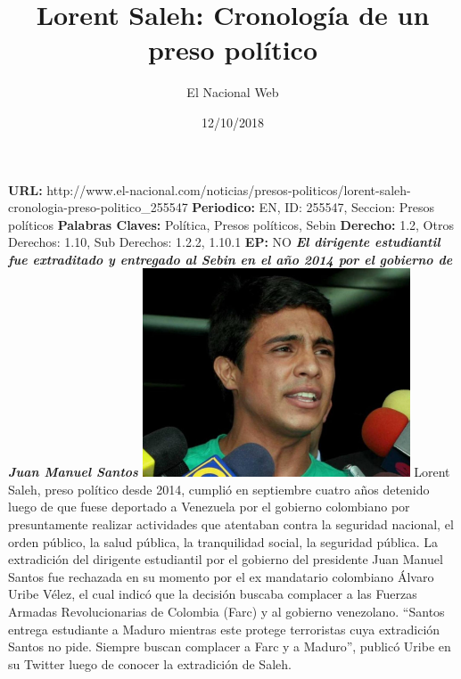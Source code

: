 \documentclass{article}%
\title{\textbf{Lorent Saleh: Cronología de un preso político}}%
\author{El Nacional Web}%
\date{12/10/2018}%
\begin{document}
%
\normalsize%
\maketitle%
\textbf{URL: }%
http://www.el{-}nacional.com/noticias/presos{-}politicos/lorent{-}saleh{-}cronologia{-}preso{-}politico\_255547\newline%
%
\textbf{Periodico: }%
EN, %
ID: %
255547, %
Seccion: %
Presos políticos\newline%
%
\textbf{Palabras Claves: }%
Política, Presos políticos, Sebin\newline%
%
\textbf{Derecho: }%
1.2, %
Otros Derechos: %
1.10, %
Sub Derechos: %
1.2.2, 1.10.1\newline%
%
\textbf{EP: }%
NO\newline%
\newline%
%
\textbf{\textit{El dirigente estudiantil fue extraditado y entregado al Sebin en el año 2014 por el gobierno de Juan Manuel Santos}}%
\newline%
\newline%
%
\includegraphics[width=300px]{111.jpg}%
\newline%
%
Lorent Saleh, preso político desde 2014, cumplió en septiembre cuatro años detenido luego de que fuese deportado a Venezuela por el gobierno colombiano por presuntamente realizar actividades que atentaban contra la seguridad nacional, el orden público, la salud pública, la tranquilidad social, la seguridad pública.%
\newline%
%
La extradición del dirigente estudiantil por el gobierno del presidente Juan Manuel Santos fue rechazada en su momento por el ex mandatario colombiano Álvaro Uribe Vélez, el cual indicó que la decisión buscaba complacer a las Fuerzas Armadas Revolucionarias de Colombia (Farc) y al gobierno venezolano.%
\newline%
%
“Santos entrega estudiante a Maduro mientras este protege terroristas cuya extradición Santos no pide. Siempre buscan complacer a Farc y a Maduro”, publicó Uribe en~ su Twitter luego de conocer la extradición de Saleh.%
\end{document}
